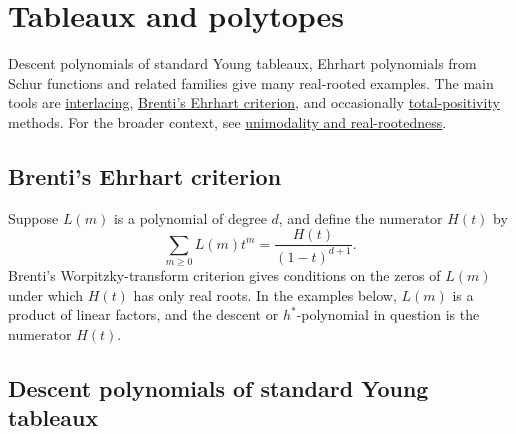 


\section[realRootedTableaux]{Tableaux and polytopes}

Descent polynomials of standard Young tableaux, Ehrhart polynomials from
Schur functions and related families give many real-rooted examples.  The
main tools are
\hyperref[interlacingPolynomials]{interlacing},
\hyperref[brentiEhrhartCriterion]{Brenti's Ehrhart criterion}, and occasionally
\hyperref[polyaFrequency]{total-positivity} methods.  For the broader context,
see \hyperref[polynomialRootIntro]{unimodality and real-rootedness}.

\subsection[brentiEhrhartCriterion]{Brenti's Ehrhart criterion}

Suppose \(L(m)\) is a polynomial of degree \(d\), and define the numerator
\(H(t)\) by
\[
  \sum_{m\geq 0} L(m)t^m = \frac{H(t)}{(1-t)^{d+1}}.
\]
Brenti's Worpitzky-transform criterion \cite[Thm.~4.6.1]{Brenti1989} gives
conditions on the zeros of \(L(m)\) under which \(H(t)\) has only real
roots.  In the examples below, \(L(m)\) is a product of linear factors, and
the descent or \(h^*\)-polynomial in question is the numerator \(H(t)\).

\subsection[sytDescentRealRooted]{Descent polynomials of standard Young tableaux}


